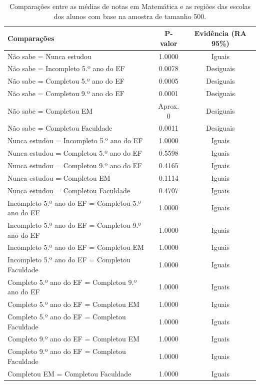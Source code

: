 \begin{table}[htb]
    \centering
\caption{\label{comp_MT}Comparações entre as médias de notas em Matemática e as regiões das escolas dos alunos com base na amostra de tamanho 500.}
    \begin{tabular}{lcc}
    \toprule
    Comparações & P-valor & Evidência (RA 95\%)\\
    \midrule \midrule
    Não sabe = Nunca estudou & 1.0000 & Iguais\\
    Não sabe = Incompleto 5.º ano do EF  & 0.0078 & Desiguais\\
    Não sabe = Completou 5.º ano do EF  & 0.0005 & Desiguais\\
    Não sabe = Completou 9.º ano do EF  & 0.0001 & Desiguais\\
    Não sabe = Completou EM & Aprox. 0 & Desiguais\\
    Não sabe = Completou Faculdade & 0.0011 & Desiguais\\
    Nunca estudou = Incompleto 5.º ano do EF  & 1.0000 & Iguais\\
    Nunca estudou = Completou 5.º ano do EF  & 0.5598 & Iguais\\
    Nunca estudou = Completou 9.º ano do EF  & 0.4165 & Iguais\\
    Nunca estudou = Completou EM & 0.1114 & Iguais\\
    Nunca estudou = Completou Faculdade & 0.4707 & Iguais\\
    Incompleto 5.º ano do EF = Completou 5.º ano do EF  & 1.0000 & Iguais\\
    Incompleto 5.º ano do EF = Completou 9.º ano do EF  & 1.0000 & Iguais\\
    Incompleto 5.º ano do EF = Completou EM & 1.0000 & Iguais\\
    Incompleto 5.º ano do EF = Completou Faculdade & 1.0000 & Iguais\\
    Completo 5.º ano do EF = Completou 9.º ano do EF  & 1.0000 & Iguais\\
    Completo 5.º ano do EF = Completou EM & 1.0000 & Iguais\\
    Completo 5.º ano do EF = Completou Faculdade & 1.0000 & Iguais\\
    Completo 9.º ano do EF = Completou EM & 1.0000 & Iguais\\
    Completo 9.º ano do EF = Completou Faculdade & 1.0000 & Iguais\\
    Completou EM = Completou Faculdade & 1.0000 & Iguais\\
    \bottomrule
    \end{tabular}
    \centering
    
\end{table}

